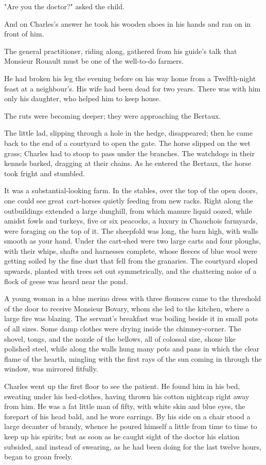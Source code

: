 \documentclass{tufte-book}
\begin{document}
"Are you the doctor?" asked the child.

And on Charles's answer he took his wooden shoes in his hands and ran on
in front of him.

The general practitioner, riding along, gathered from his guide's talk
that Monsieur Rouault must be one of the well-to-do farmers.

He had broken his leg the evening before on his way home from a
Twelfth-night feast at a neighbour's. His wife had been dead for two
years. There was with him only his daughter, who helped him to keep
house.

The ruts were becoming deeper; they were approaching the Bertaux.

The little lad, slipping through a hole in the hedge, disappeared;
then he came back to the end of a courtyard to open the gate. The
horse slipped on the wet grass; Charles had to stoop to pass under
the branches. The watchdogs in their kennels barked, dragging at their
chains. As he entered the Bertaux, the horse took fright and stumbled.

It was a substantial-looking farm. In the stables, over the top of the
open doors, one could see great cart-horses quietly feeding from new
racks. Right along the outbuildings extended a large dunghill, from
which manure liquid oozed, while amidst fowls and turkeys, five or six
peacocks, a luxury in Chauchois farmyards, were foraging on the top of
it. The sheepfold was long, the barn high, with walls smooth as your
hand. Under the cart-shed were two large carts and four ploughs, with
their whips, shafts and harnesses complete, whose fleeces of blue wool
were getting soiled by the fine dust that fell from the granaries. The
courtyard sloped upwards, planted with trees set out symmetrically, and
the chattering noise of a flock of geese was heard near the pond.

A young woman in a blue merino dress with three flounces came to the
threshold of the door to receive Monsieur Bovary, whom she led to the
kitchen, where a large fire was blazing. The servant's breakfast was
boiling beside it in small pots of all sizes. Some damp clothes were
drying inside the chimney-corner. The shovel, tongs, and the nozzle
of the bellows, all of colossal size, shone like polished steel, while
along the walls hung many pots and pans in which the clear flame of the
hearth, mingling with the first rays of the sun coming in through the
window, was mirrored fitfully.

Charles went up the first floor to see the patient. He found him in his
bed, sweating under his bed-clothes, having thrown his cotton nightcap
right away from him. He was a fat little man of fifty, with white skin
and blue eyes, the forepart of his head bald, and he wore earrings. By
his side on a chair stood a large decanter of brandy, whence he poured
himself a little from time to time to keep up his spirits; but as soon
as he caught sight of the doctor his elation subsided, and instead of
swearing, as he had been doing for the last twelve hours, began to groan
freely.
\end{document}
